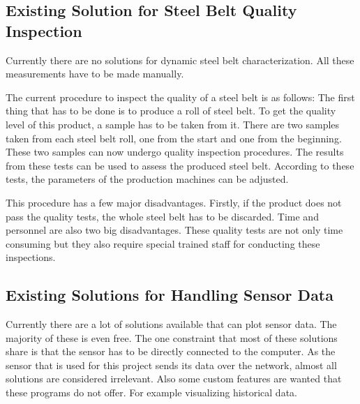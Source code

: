

\subsection{Existing Solution for Steel Belt Quality Inspection}

Currently there are no solutions for dynamic steel belt characterization. All these measurements have to be made manually.

The current procedure to inspect the quality of a steel belt is as follows: The first thing that has to be done is to produce a roll of steel belt. To get the quality level of this product, a sample has to be taken from it. There are two samples taken from each steel belt roll, one from the start and one from the beginning. These two samples can now undergo quality inspection procedures. The results from these tests can be used to assess the produced steel belt. According to these tests, the parameters of the production machines can be adjusted.

This procedure has a few major disadvantages. Firstly, if the product does not pass the quality tests, the whole steel belt has to be discarded. Time and personnel are also two big disadvantages. These quality tests are not only time consuming but they also require special trained staff for conducting these inspections.

\subsection{Existing Solutions for Handling Sensor Data}

Currently there are a lot of solutions available that can plot sensor data. The majority of these is even free. The one constraint that most of these solutions share is that the sensor has to be directly connected to the computer. As the sensor that is used for this project sends its data over the network, almost all solutions are considered irrelevant. Also some custom features are wanted that these programs do not offer. For example visualizing historical data.

